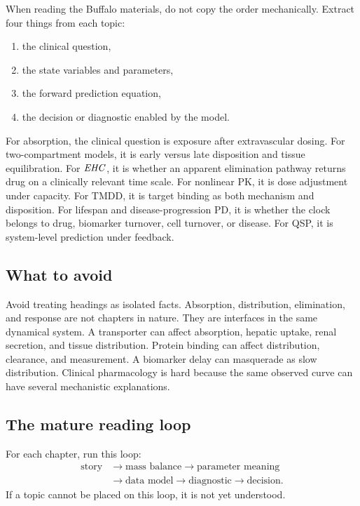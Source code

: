\documentclass[a4paper]{article}
\newcommand{\pkEHC}{\pksym{EHC}}
\begin{document}
When reading the Buffalo materials, do not copy the order mechanically. Extract four things from each topic:
\begin{enumerate}[leftmargin=2em]
  \item the clinical question,
  \item the state variables and parameters,
  \item the forward prediction equation,
  \item the decision or diagnostic enabled by the model.
\end{enumerate}
For absorption, the clinical question is exposure after extravascular dosing. For two-compartment models, it is early versus late disposition and tissue equilibration. For \(\pkEHC\), it is whether an apparent elimination pathway returns drug on a clinically relevant time scale. For nonlinear PK, it is dose adjustment under capacity. For TMDD, it is target binding as both mechanism and disposition. For lifespan and disease-progression PD, it is whether the clock belongs to drug, biomarker turnover, cell turnover, or disease. For QSP, it is system-level prediction under feedback.

\subsection{What to avoid}

Avoid treating headings as isolated facts. Absorption, distribution, elimination, and response are not chapters in nature. They are interfaces in the same dynamical system. A transporter can affect absorption, hepatic uptake, renal secretion, and tissue distribution. Protein binding can affect distribution, clearance, and measurement. A biomarker delay can masquerade as slow distribution. Clinical pharmacology is hard because the same observed curve can have several mechanistic explanations.

\subsection{The mature reading loop}

For each chapter, run this loop:
\[
  \begin{aligned}
  \text{story}
  &\to
  \text{mass balance}
  \to
  \text{parameter meaning}\\
  &\to
  \text{data model}
  \to
  \text{diagnostic}
  \to
  \text{decision}.
  \end{aligned}
\]
If a topic cannot be placed on this loop, it is not yet understood.
\end{document}
